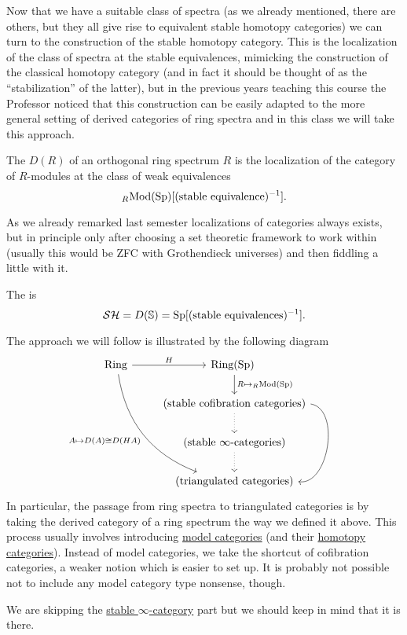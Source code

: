 Now that we have a suitable class of spectra (as we already mentioned, there are others, but they all give rise to equivalent stable homotopy categories) we can turn to the construction of the stable homotopy category. This is the localization of the class of spectra at the stable equivalences, mimicking the construction of the classical homotopy category (and in fact it should be thought of as the \enquote{stabilization} of the latter), but in the previous years teaching this course the Professor noticed that this construction can be easily adapted to the more general setting of derived categories of ring spectra and in this class we will take this approach.

\begin{definition}
	The  $D(R)$ of an orthogonal ring spectrum $R$ is the localization of the category of $R$-modules at the class of weak equivalences
    \[{}_{R\!}\operatorname{Mod}({\normalfont\textup{Sp}})[(\text{stable equivalence})^{-1}].\]
\end{definition}

\begin{remark}
As we already remarked last semester localizations of categories always exists, but in principle only after choosing a set theoretic framework to work within (usually this would be ZFC with Grothendieck universes) and then fiddling a little with it.
\end{remark}

\begin{definition}
The  is 
\[\mathcal{S}\mathcal{H}=D(\mathbb{S})={\normalfont\textup{Sp}}[(\text{stable equivalences})^{-1}].\]
\end{definition}

The approach we will follow is illustrated by the following diagram
\[
\begin{tikzcd}
\Ring \arrow[r, "H"] \arrow[rddd, bend right, "A \mapsto D(A) \cong D(HA)", swap] & \Ring(\Sp) \arrow[d, "R \mapsto\RMod"] \ \\
 & (\text{stable cofibration categories}) \arrow[d, dotted] \arrow[dd, bend left = 90]\\
 & (\text{stable $\infty$-categories}) \arrow[d, dotted]\\
 & (\text{triangulated categories})
\end{tikzcd}
\]
In particular, the passage from ring spectra to triangulated categories is by taking the derived category of a ring spectrum the way we defined it above. This process usually involves introducing \href{https://ncatlab.org/nlab/show/model+category}{model categories} (and their \href{https://ncatlab.org/nlab/show/homotopy+category+of+a+model+category}{homotopy categories}). Instead of model categories, we take the shortcut of cofibration categories, a weaker notion which is easier to set up. It is probably not possible not to include any model category type nonsense, though.

We are skipping the \href{https://ncatlab.org/nlab/show/stable+\%28infinity\%2C1\%29-category}{stable $\infty$-category} part but we should keep in mind that it is there. 